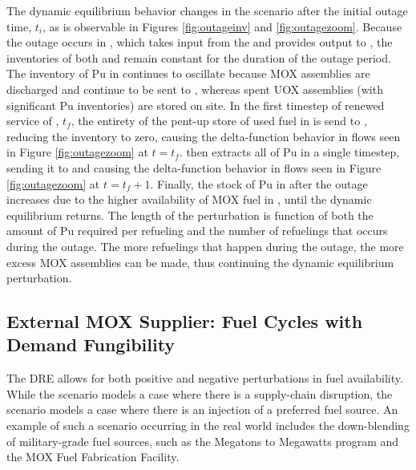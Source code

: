 The dynamic equilibrium behavior changes in the \outage scenario after the
initial outage time, $t_i$, as is observable in Figures \ref{fig:outageinv} and
\ref{fig:outagezoom}. Because the outage occurs in \separations, which takes
input from the \reactors and provides output to \fabrication, the inventories of
both \separations and \fabrication remain constant for the duration of the
outage period. The inventory of Pu in \reactors continues to oscillate
because MOX assemblies are discharged and continue to be sent to \storage,
whereas spent UOX assemblies (with significant Pu inventories) are stored on
site. In the first timestep of renewed service of \separations, $t_f$, the
entirety of the pent-up store of used fuel in \reactors is send to \separations,
reducing the inventory to zero, causing the delta-function behavior in \reactor
flows seen in Figure \ref{fig:outagezoom} at $t = t_f$. \separations then
extracts all of Pu in a single timestep, sending it to \fabrication and
causing the delta-function behavior in \separations flows seen in Figure
\ref{fig:outagezoom} at $t = t_f + 1$. Finally, the stock of Pu in \reactors
after the outage increases due to the higher availability of MOX fuel in
\fabrication, until the dynamic equilibrium returns. The length of the
perturbation is function of both the amount of Pu required per refueling and
the number of refuelings that occurs during the outage. The more refuelings that
happen during the outage, the more excess MOX assemblies can be made, thus
continuing the dynamic equilibrium perturbation.

\subsection{External MOX Supplier: Fuel Cycles with Demand Fungibility}

The DRE allows for both positive and negative perturbations in fuel
availability. While the \outage scenario models a case where there is a
supply-chain disruption, the \external scenario models a case where
there is an injection of a preferred fuel source. An example of such a scenario
occurring in the real world includes the down-blending of military-grade fuel
sources, such as the Megatons to Megawatts program and the MOX Fuel Fabrication
Facility.

